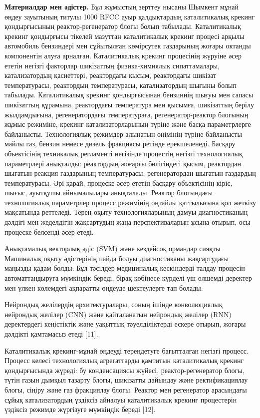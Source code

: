 {\bfseries Материалдар мен әдістер.} Бұл жұмыстың зерттеу нысаны Шымкент
мұнай өңдеу зауытының титулы 1000 RFCC ауыр қалдықтардың каталитикалық
крекинг қондырғысының реактор-регенератор блогы болып табылады.
Каталитикалық крекинг қондырғысы тікелей мазуттан каталитикалық крекинг
процесі арқылы автомобиль бензиндері мен сұйытылған көмірсутек
газдарының жоғары октанды компонентін алуға арналған. Каталитикалық
крекинг процесінің жүруіне әсер ететін негізгі факторлар шикізаттың
физика-химиялық сипаттамалары, катализатордың қасиеттері, реактордағы
қысым, реактордағы шикізат температурасы, реактордың температурасы,
катализатордың шығыны болып табылады. Каталитикалық крекинг
қондырғысынан бензиннің шығуы мен сапасы шикізаттың құрамына,
реактордағы температура мен қысымға, шикізаттың берілу жылдамдығына,
регенератордағы температураға, регенератор-реактор блогының жұмыс
режиміне, крекинг катализаторларының түріне және басқа параметрлерге
байланысты. Технологиялық режимдер алынатын өнімінің түріне байланысты
майлы газ, бензин немесе дизель фракциясы ретінде ерекшеленеді. Басқару
объектісінің техникалық регламенті негізінде процестің негізгі
технологиялық параметрлері анықталды: реактордың жоғарғы бөлігіндегі
қысым, реактордан шығатын реакция газдарының температурасы,
регенератордан шығатын газдардың температурасы. Әрі қарай, процеске әсер
ететін басқару объектісінің кіріс, шығыс, ауытқушы айнымалылары
анықталады. Реактор блогындағы технологиялық параметрлер процесс
режимінің оңтайлы қаттылығына қол жеткізу мақсатында реттеледі. Терең
оқыту технологияларының дамуы диагностиканың дәлдігі мен жеделдігін
жақсартудың жаңа перспективаларын ұсына отырып, осы процеске белсенді
әсер етеді.

Анықтамалық векторлық әдіс (SVM) және кездейсоқ ормандар сияқты
Машиналық оқыту әдістерінің пайда болуы диагностиканы жақсартудағы
маңызды қадам болды. Бұл тәсілдер медициналық кескіндерді талдау
процесін автоматтандыруға мүмкіндік береді, бірақ көбінесе күрделі үш
өлшемді деректер мен үлкен көлемдегі ақпаратты өңдеуде шектеулерге тап
болады.

Нейрондық желілердің архитектуралары, соның ішінде конволюциялық
нейрондық желілер (CNN) және қайталанатын нейрондық желілер (RNN)
деректердегі кеңістіктік және уақыттық тәуелділіктерді ескере отырып,
жоғары дәлдікті қамтамасыз етеді {[}11{]}.

Каталитикалық крекинг-мұнай өңдеуді тереңдетуге бағытталған негізгі
процесс. Процесс келесі технологиялық агрегаттарды қамтитын
каталитикалық крекинг қондырғысында жүреді: бу конденсациясы жүйесі,
реактор-регенератор блогы, түтін газын дымқыл тазарту блогы, шикізатты
дайындау және ректификациялау блогы, сіңіру және газ фракциялау блогы.
Реактор мен регенератор арасындағы сұйық катализатордың үздіксіз айналуы
каталитикалық крекинг процестерін үздіксіз режимде жүргізуге мүмкіндік
береді {[}12{]}.

